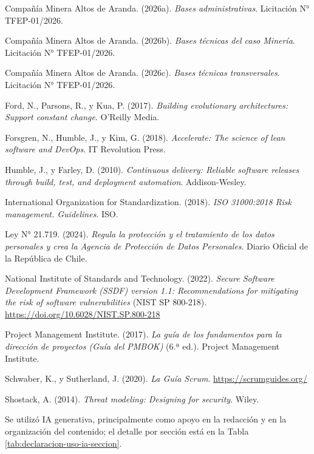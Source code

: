 \documentclass[subdoc]{../../comun/overfore}
\begin{document}
\begin{referencias}
\item Compañía Minera Altos de Aranda. (2026a). \emph{Bases administrativas}. Licitación N° TFEP-01/2026.
\item Compañía Minera Altos de Aranda. (2026b). \emph{Bases técnicas del caso Minería}. Licitación N° TFEP-01/2026.
\item Compañía Minera Altos de Aranda. (2026c). \emph{Bases técnicas transversales}. Licitación N° TFEP-01/2026.
\item Ford, N., Parsons, R., y Kua, P. (2017). \emph{Building evolutionary architectures: Support constant change}. O'Reilly Media.
\item Forsgren, N., Humble, J., y Kim, G. (2018). \emph{Accelerate: The science of lean software and DevOps}. IT Revolution Press.
\item Humble, J., y Farley, D. (2010). \emph{Continuous delivery: Reliable software releases through build, test, and deployment automation}. Addison-Wesley.
\item International Organization for Standardization. (2018). \emph{ISO 31000:2018 Risk management. Guidelines}. ISO.
\item Ley N° 21.719. (2024). \emph{Regula la protección y el tratamiento de los datos personales y crea la Agencia de Protección de Datos Personales}. Diario Oficial de la República de Chile.
\item National Institute of Standards and Technology. (2022). \emph{Secure Software Development Framework (SSDF) version 1.1: Recommendations for mitigating the risk of software vulnerabilities} (NIST SP 800-218). \href{https://doi.org/10.6028/NIST.SP.800-218}{https://doi.org/10.6028/NIST.SP.800-218}
\item Project Management Institute. (2017). \emph{La guía de los fundamentos para la dirección de proyectos (Guía del PMBOK)} (6.ª ed.). Project Management Institute.
\item Schwaber, K., y Sutherland, J. (2020). \emph{La Guía Scrum}. \href{https://scrumguides.org/}{https://scrumguides.org/}
\item Shostack, A. (2014). \emph{Threat modeling: Designing for security}. Wiley.
\end{referencias}

Se utilizó IA generativa, principalmente como apoyo en la redacción y en la organización del contenido; el detalle por sección está en la Tabla \ref{tab:declaracion-uso-ia-seccion}.
\end{document}
